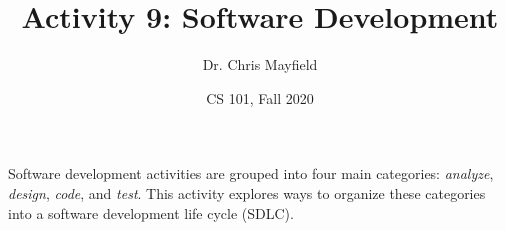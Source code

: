 \documentclass[12pt]{article}
\title{Activity 9: Software Development}
\author{Dr. Chris Mayfield}
\date{CS 101, Fall 2020}
\begin{document}
\maketitle

Software development activities are grouped into four main categories: \emph{analyze}, \emph{design}, \emph{code}, and \emph{test}.
This activity explores ways to organize these categories into a software development life cycle (SDLC).




\end{document}

